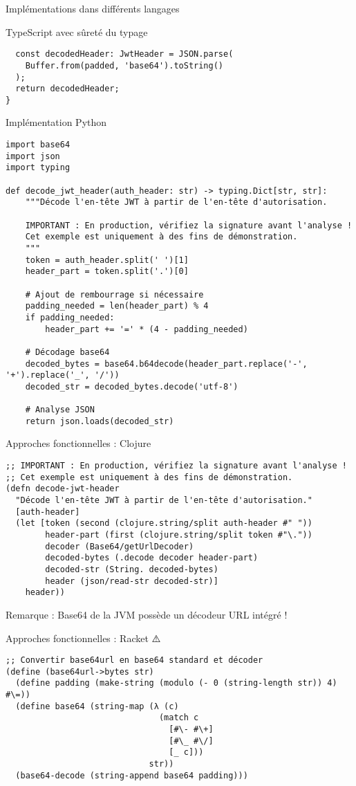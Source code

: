 \documentclass[presentation,aspectratio=169]{beamer}
\begin{document}
\begin{frame}[label={sec:org25093b4},fragile]{Implémentations dans différents langages}
\begin{block}{TypeScript avec sûreté du typage 🧩}
\begin{verbatim}
  const decodedHeader: JwtHeader = JSON.parse(
    Buffer.from(padded, 'base64').toString()
  );
  return decodedHeader;
}
\end{verbatim}
\end{block}
\begin{block}{Implémentation Python 🧩}
\begin{verbatim}
import base64
import json
import typing

def decode_jwt_header(auth_header: str) -> typing.Dict[str, str]:
    """Décode l'en-tête JWT à partir de l'en-tête d'autorisation.

    IMPORTANT : En production, vérifiez la signature avant l'analyse !
    Cet exemple est uniquement à des fins de démonstration.
    """
    token = auth_header.split(' ')[1]
    header_part = token.split('.')[0]

    # Ajout de rembourrage si nécessaire
    padding_needed = len(header_part) % 4
    if padding_needed:
        header_part += '=' * (4 - padding_needed)

    # Décodage base64
    decoded_bytes = base64.b64decode(header_part.replace('-', '+').replace('_', '/'))
    decoded_str = decoded_bytes.decode('utf-8')

    # Analyse JSON
    return json.loads(decoded_str)
\end{verbatim}
\end{block}
\begin{block}{Approches fonctionnelles : Clojure 🧩}
\begin{verbatim}
;; IMPORTANT : En production, vérifiez la signature avant l'analyse !
;; Cet exemple est uniquement à des fins de démonstration.
(defn decode-jwt-header 
  "Décode l'en-tête JWT à partir de l'en-tête d'autorisation."
  [auth-header]
  (let [token (second (clojure.string/split auth-header #" "))
        header-part (first (clojure.string/split token #"\."))
        decoder (Base64/getUrlDecoder)
        decoded-bytes (.decode decoder header-part)
        decoded-str (String. decoded-bytes)
        header (json/read-str decoded-str)]
    header))
\end{verbatim}

\alert{Remarque} : Base64 de la JVM possède un décodeur URL intégré !
\end{block}
\begin{block}{Approches fonctionnelles : Racket ⚠️}
\begin{verbatim}
;; Convertir base64url en base64 standard et décoder
(define (base64url->bytes str)
  (define padding (make-string (modulo (- 0 (string-length str)) 4) #\=))
  (define base64 (string-map (λ (c)
                               (match c
                                 [#\- #\+]
                                 [#\_ #\/]
                                 [_ c]))
                             str))
  (base64-decode (string-append base64 padding)))


\end{verbatim}
\end{block}
\end{frame}
\end{document}
